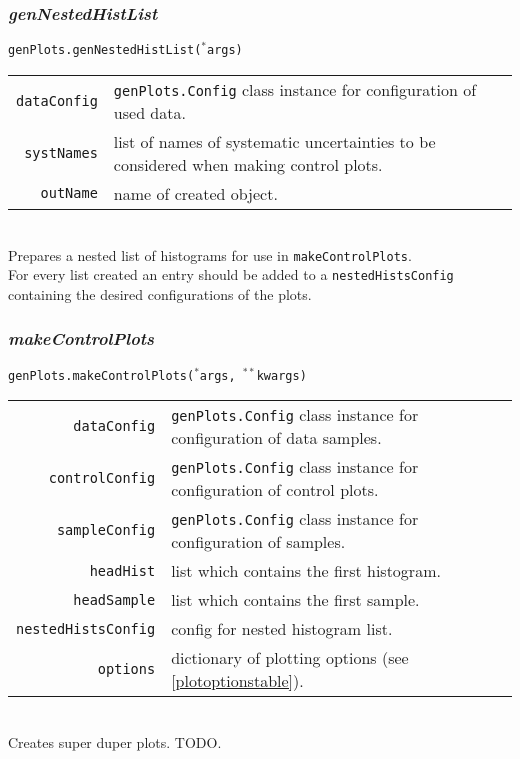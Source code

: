 \documentclass[12pt, a4paper]{article}
\newcommand{\args}{$^*$args}
\newcommand{\kwargs}{$^{**}$kwargs}
\begin{document}
\subsubsection{\textit{genNestedHistList}}
\texttt{genPlots.genNestedHistList(\args)}\\
\begin{tabular}{r|l}
\hline
\texttt{dataConfig}		& \texttt{genPlots.Config} class instance for configuration of used data.\\
\texttt{systNames}		& list of names of systematic uncertainties to be considered when making control plots.\\
\texttt{outName}		& name of created object.\\
\hline
\end{tabular}
\\
Prepares a nested list of histograms for use in \texttt{makeControlPlots}.\\ 
For every list created an entry should be added to a \texttt{nestedHistsConfig} containing the desired configurations of the plots.


\subsubsection{\textit{makeControlPlots}}
\texttt{genPlots.makeControlPlots(\args, \kwargs)}\\
\begin{tabular}{r|l}
\hline
\texttt{dataConfig}			&	\texttt{genPlots.Config} class instance for configuration of data samples.\\
\texttt{controlConfig}		&	\texttt{genPlots.Config} class instance for configuration of control plots.\\
\texttt{sampleConfig}		&	\texttt{genPlots.Config} class instance for configuration of samples.\\
\texttt{headHist}			&   list which contains the first histogram.\\
\texttt{headSample}			&	list which contains the first sample.\\
\texttt{nestedHistsConfig}	&	config for nested histogram list.\\
\texttt{options}			&	dictionary of plotting options (see \ref{plotoptionstable}).\\
\hline
\end{tabular}
\\
Creates super duper plots. TODO.
\end{document}
